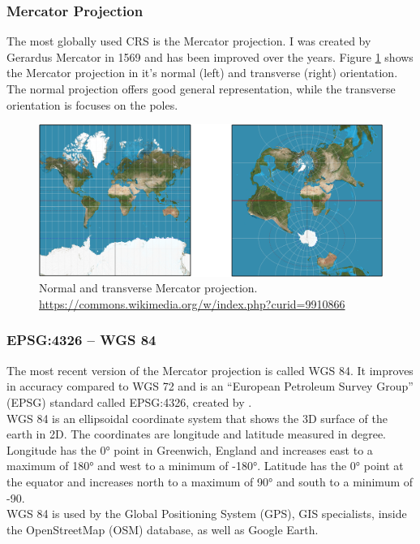 \subsubsection{Mercator Projection}
The most globally used CRS is the Mercator projection. I was created by Gerardus Mercator in 1569 \cite{meer2012atlas} and has been improved over the years. Figure \ref{fig:mercator} shows the Mercator projection in it's normal (left) and transverse (right) orientation. The normal projection offers good general representation, while the transverse orientation is focuses on the poles.
\begin{figure}[H]
	\centering\includegraphics[width=1\textwidth]{res/Mercator}
	\caption{Normal and transverse Mercator projection. \url{https://commons.wikimedia.org/w/index.php?curid=9910866}}
	\label{fig:mercator}
\end{figure}

\subsubsection{EPSG:4326 -- WGS 84}
The most recent version of the Mercator projection is called WGS 84. It improves in accuracy compared to WGS 72 and is an \enquote{European Petroleum Survey Group} (EPSG) standard called EPSG:4326, created by \cite{Decker1986}.\\
WGS 84 is an ellipsoidal coordinate system that shows the 3D surface of the earth in 2D. The coordinates are longitude and latitude measured in degree. Longitude has the 0° point in Greenwich, England and increases east to a maximum of 180° and west to a minimum of -180°. Latitude has the 0° point at the equator and increases north to a maximum of 90° and south to a minimum of -90.\\
WGS 84 is used by the Global Positioning System (GPS), GIS specialists, inside the OpenStreetMap (OSM) database, as well as Google Earth.

